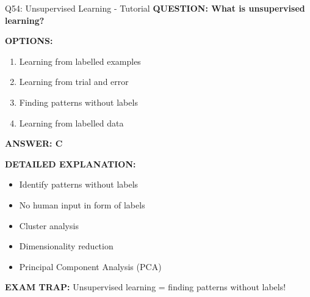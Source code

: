 \documentclass[8pt]{beamer}
\begin{document}
	\begin{frame}{Q54: Unsupervised Learning - Tutorial}
		\fontsize{6.5}{7.5}\selectfont
		\textbf{QUESTION: What is unsupervised learning?}
		
		\vspace{0.1cm}
		\textbf{OPTIONS:}
		\begin{enumerate}
			\item Learning from labelled examples
			\item Learning from trial and error
			\item Finding patterns without labels
			\item Learning from labelled data
		\end{enumerate}
		
		\vspace{0.1cm}
		\textcolor{myblue}{\textbf{ANSWER: C}}
		
		\vspace{0.1cm}
		\textbf{DETAILED EXPLANATION:}
		\begin{itemize}
			\item Identify patterns without labels
			\item No human input in form of labels
			\item Cluster analysis
			\item Dimensionality reduction
			\item Principal Component Analysis (PCA)
		\end{itemize}
		
		\vspace{0.1cm}
		\textcolor{myred}{\textbf{EXAM TRAP:}} Unsupervised learning = \textcolor{myblue}{finding patterns without labels}!
	\end{frame}
	
\end{document}
